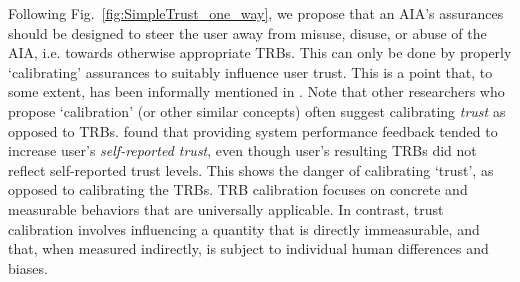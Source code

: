     Following Fig.~\ref{fig:SimpleTrust_one_way}, we propose that an AIA's assurances should be designed to steer the user away from misuse, disuse, or abuse of the AIA, i.e. towards otherwise appropriate TRBs. This can only be done by properly `calibrating' assurances to suitably influence user trust. This is a point that, to some extent, has been informally mentioned in \cite{Muir1994-ow,Lillard2016-yg,Lee2004-pv,Hutchins2015-if}. Note that other researchers who propose `calibration' (or other similar concepts) often suggest calibrating \emph{trust} as opposed to TRBs. \citet{Dzindolet2003-ts} found that providing system performance feedback tended to increase user's \textit{self-reported trust}, even though user's resulting TRBs did not reflect self-reported trust levels. This shows the danger of calibrating `trust', as opposed to calibrating the TRBs. TRB calibration focuses on concrete and measurable behaviors that are universally applicable. In contrast, trust calibration involves influencing a quantity that is directly immeasurable, and that, when measured indirectly, is subject to individual human differences and biases.
